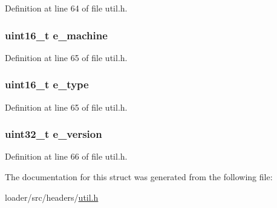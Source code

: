 Definition at line 64 of file util.\+h.

\subsubsection[{\texorpdfstring{e\+\_\+machine}{e_machine}}]{\setlength{\rightskip}{0pt plus 5cm}uint16\+\_\+t e\+\_\+machine}\hypertarget{structelf__hdr_a2309339880d17e277892a8850e819d55}{}\label{structelf__hdr_a2309339880d17e277892a8850e819d55}


Definition at line 65 of file util.\+h.

\subsubsection[{\texorpdfstring{e\+\_\+type}{e_type}}]{\setlength{\rightskip}{0pt plus 5cm}uint16\+\_\+t e\+\_\+type}\hypertarget{structelf__hdr_a4160b480f72e4477cab7a0375f8535ea}{}\label{structelf__hdr_a4160b480f72e4477cab7a0375f8535ea}


Definition at line 65 of file util.\+h.

\subsubsection[{\texorpdfstring{e\+\_\+version}{e_version}}]{\setlength{\rightskip}{0pt plus 5cm}uint32\+\_\+t e\+\_\+version}\hypertarget{structelf__hdr_ab5ece8e1aa0f68bcf4a3476200dc29dc}{}\label{structelf__hdr_ab5ece8e1aa0f68bcf4a3476200dc29dc}


Definition at line 66 of file util.\+h.



The documentation for this struct was generated from the following file\+:\begin{DoxyCompactItemize}
\item 
loader/src/headers/\hyperlink{loader_2src_2headers_2util_8h}{util.\+h}\end{DoxyCompactItemize}
